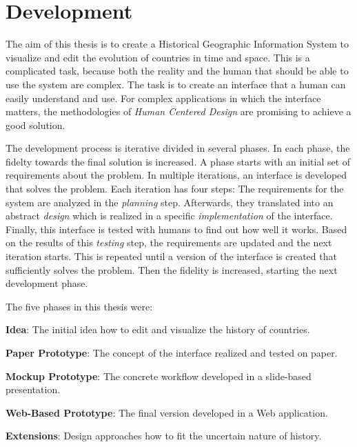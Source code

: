 
\chapter{Development} %
\label{cha:development}

The aim of this thesis is to create a Historical Geographic Information System to visualize and edit the evolution of countries in time and space. This is a complicated task, because both the reality and the human that should be able to use the system are complex. The task is to create an interface that a human can easily understand and use. For complex applications in which the interface matters, the methodologies of \emph{Human Centered Design} are promising to achieve a good solution.

The development process is iterative divided in several phases. In each phase, the fidelty towards the final solution is increased. A phase starts with an initial set of requirements about the problem. In multiple iterations, an interface is developed that solves the problem. Each iteration has four steps: The requirements for the system are analyzed in the \emph{planning} step. Afterwards, they translated into an abstract \emph{design} which is realized in a specific \emph{implementation} of the interface. Finally, this interface is tested with humans to find out how well it works. Based on the results of this \emph{testing} step, the requirements are updated and the next iteration starts. This is repeated until a version of the interface is created that sufficiently solves the problem. Then the fidelity is increased, starting the next development phase.

The five phases in this thesis were:
\begin{compactenum}
  \item \textbf{Idea}: The initial idea how to edit and visualize the history of countries.
  \item \textbf{Paper Prototype}: The concept of the interface realized and tested on paper.
  \item \textbf{Mockup Prototype}: The concrete workflow developed in a slide-based presentation.
  \item \textbf{Web-Based Prototype}: The final version developed in a Web application.
  \item \textbf{Extensions}: Design approaches how to fit the uncertain nature of history.
\end{compactenum}


